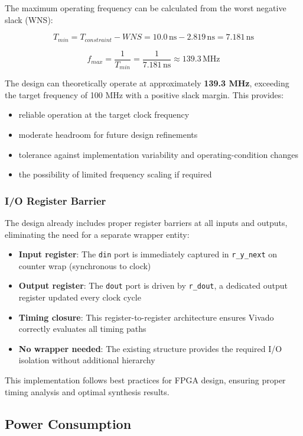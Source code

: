 \documentclass[a4paper,11pt]{article}
\begin{document}
The maximum operating frequency can be calculated from the worst negative slack (WNS):

\[
T_{min} = T_{constraint} - WNS = 10.0\,\text{ns} - 2.819\,\text{ns} = 7.181\,\text{ns}
\]

\[
f_{max} = \frac{1}{T_{min}} = \frac{1}{7.181\,\text{ns}} \approx 139.3\,\text{MHz}
\]

The design can theoretically operate at approximately \textbf{139.3 MHz}, exceeding the target frequency of 100 MHz with a positive slack margin. This provides:
\begin{itemize}
    \item reliable operation at the target clock frequency
    \item moderate headroom for future design refinements
    \item tolerance against implementation variability and operating-condition changes
    \item the possibility of limited frequency scaling if required
\end{itemize}

\subsubsection{I/O Register Barrier}

The design already includes proper register barriers at all inputs and outputs, eliminating the need for a separate wrapper entity:
\begin{itemize}
    \item \textbf{Input register}: The \texttt{din} port is immediately captured in \texttt{r\_y\_next} on counter wrap (synchronous to clock)
    \item \textbf{Output register}: The \texttt{dout} port is driven by \texttt{r\_dout}, a dedicated output register updated every clock cycle
    \item \textbf{Timing closure}: This register-to-register architecture ensures Vivado correctly evaluates all timing paths
    \item \textbf{No wrapper needed}: The existing structure provides the required I/O isolation without additional hierarchy
\end{itemize}

This implementation follows best practices for FPGA design, ensuring proper timing analysis and optimal synthesis results.

\subsection{Power Consumption}
\end{document}
